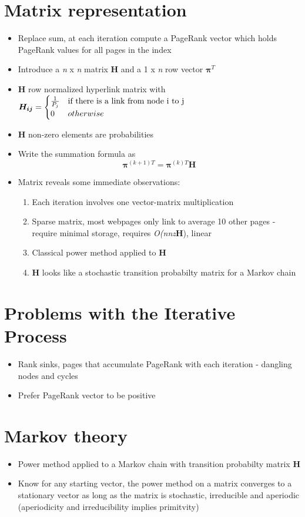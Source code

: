 \documentclass[11pt]{report}
\begin{document}
\section{Matrix representation}
\begin{itemize}
\item Replace sum, at each iteration compute a PageRank vector which holds PageRank values for all pages in the index
\item Introduce a \textit{n} x \textit{n} matrix \textbf{H} and a 1 x \textit{n} row vector $\boldsymbol{\pi}^T$
\item \textbf{H} row normalized hyperlink matrix with $\boldsymbol{H_{ij}} = \begin{cases} \frac{1}{P_j} &  \textnormal{if there is a link from node i to j}  \\ 0 & otherwise\end{cases}$ 
\item \textbf{H} non-zero elements are probabilities
\item Write the summation formula as \begin{equation}
\boldsymbol{\pi}^{(k+1)T} = \boldsymbol{\pi}^{(k)T}\textbf{H}
\end{equation}
\item Matrix reveals some immediate observations:
\begin{enumerate}
\item Each iteration involves one vector-matrix multiplication
\item Sparse matrix, most webpages only link to average 10 other pages - require minimal storage, requires \textit{O(nnz}\textbf{H}), linear
\item Classical power method applied to \textbf{H}
\item \textbf{H} looks like a stochastic transition probabilty matrix for a Markov chain
\end{enumerate}
\end{itemize}
\section{Problems with the Iterative Process}
\begin{itemize}
\item Rank sinks, pages that accumulate PageRank with each iteration - dangling nodes and cycles
\item Prefer PageRank vector to be positive
\end{itemize}
\section{Markov theory}
\begin{itemize}
\item Power method applied to a Markov chain with transition probabilty matrix \textbf{H}
\item Know for any starting vector, the power method on a matrix converges to a stationary vector as long as the matrix is stochastic, irreducible and aperiodic (aperiodicity and irreducibility implies primitvity)
\end{itemize}
\end{document}

